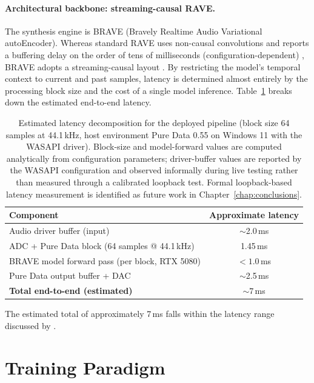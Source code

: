 \documentclass[a4paper,11pt,oneside,openany]{book}
\begin{document}
\paragraph{Architectural backbone: streaming-causal RAVE.} The synthesis engine is BRAVE (Bravely Realtime Audio Variational autoEncoder). Whereas standard RAVE uses non-causal convolutions and reports a buffering delay on the order of tens of milliseconds (configuration-dependent) \parencite{caillon2021rave}, BRAVE adopts a streaming-causal layout \parencite{caspe2025brave}. By restricting the model's temporal context to current and past samples, latency is determined almost entirely by the processing block size and the cost of a single model inference. Table~\ref{tab:latency_budget} breaks down the estimated end-to-end latency.

\begin{table}[H]
\centering
\caption{Estimated latency decomposition for the deployed pipeline (block size 64 samples at 44.1\,kHz, host environment Pure Data 0.55 on Windows 11 with the WASAPI driver). Block-size and model-forward values are computed analytically from configuration parameters; driver-buffer values are reported by the WASAPI configuration and observed informally during live testing rather than measured through a calibrated loopback test. Formal loopback-based latency measurement is identified as future work in Chapter~\ref{chap:conclusions}.}
\label{tab:latency_budget}
\begin{tabular}{lc}
\toprule
\textbf{Component} & \textbf{Approximate latency} \\
\midrule
Audio driver buffer (input) & $\sim$2.0\,ms \\
ADC + Pure Data block (64 samples @ 44.1\,kHz) & 1.45\,ms \\
BRAVE model forward pass (per block, RTX 5080) & $<1.0$\,ms \\
Pure Data output buffer + DAC & $\sim$2.5\,ms \\
\midrule
\textbf{Total end-to-end (estimated)} & $\sim 7$\,ms \\
\bottomrule
\end{tabular}
\end{table}

The estimated total of approximately 7\,ms falls within the latency range discussed by \textcite{wessel2002intimate}.

\section{Training Paradigm}\label{sec:training_paradigm}
\end{document}
